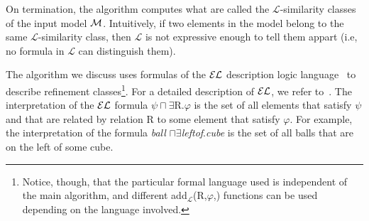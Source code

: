 






On termination, the algorithm computes what are called the $\mathcal{L}$-similarity classes of the input model $\mathcal{M}$. Intuitively, if two elements in the model belong to the same $\mathcal{L}$-similarity class, then $\mathcal{L}$ is not expressive enough to tell them appart (i.e, no formula in $\mathcal{L}$ can distinguish them). 

The algorithm we discuss uses formulas of the $\mathcal{EL}$ description logic language~\cite{baad:desc03} to describe refinement classes\footnote{Notice, though, that the particular formal language used is independent of the main algorithm, and different add$_{\mathcal{L}}$(R,$\varphi$,\RE) functions can be used depending on the language involved.}. 
For a detailed description of $\mathcal{EL}$, we refer to~\cite{baad:desc03}.  
The interpretation of the $\mathcal{EL}$ formula $\psi \sqcap \exists$R.$\varphi$ is the set of all elements that satisfy $\psi$ and that are related by relation R to some element that satisfy $\varphi$. 
For example, the interpretation of the formula \emph{ball} $\sqcap \exists$\emph{leftof}.\emph{cube} is the set of all balls that are on the left of some cube.  

